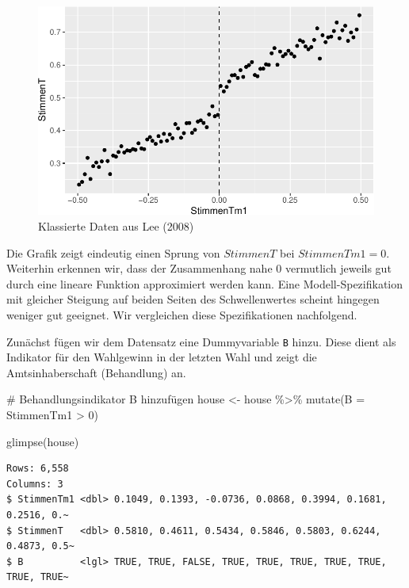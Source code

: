 \documentclass[
  a4paper,
  DIV=11,
  oneside]{scrreprt}
\newenvironment{Shaded}{\begin{snugshade}}{\end{snugshade}}
\newcommand{\AttributeTok}[1]{\textcolor[rgb]{0.40,0.45,0.13}{#1}}
\newcommand{\CommentTok}[1]{\textcolor[rgb]{0.37,0.37,0.37}{#1}}
\newcommand{\DecValTok}[1]{\textcolor[rgb]{0.68,0.00,0.00}{#1}}
\newcommand{\FunctionTok}[1]{\textcolor[rgb]{0.28,0.35,0.67}{#1}}
\newcommand{\NormalTok}[1]{\textcolor[rgb]{0.00,0.23,0.31}{#1}}
\newcommand{\OtherTok}[1]{\textcolor[rgb]{0.00,0.23,0.31}{#1}}
\newcommand{\SpecialCharTok}[1]{\textcolor[rgb]{0.37,0.37,0.37}{#1}}
\begin{document}
\begin{figure}[t]

{\centering \includegraphics{RDD_files/figure-pdf/fig-LeeDataClass-1.pdf}

}

\caption{\label{fig-LeeDataClass}Klassierte Daten aus Lee (2008)}

\end{figure}

Die Grafik zeigt eindeutig einen Sprung von \(StimmenT\) bei
\(StimmenTm1 = 0\). Weiterhin erkennen wir, dass der Zusammenhang nahe
\(0\) vermutlich jeweils gut durch eine lineare Funktion approximiert
werden kann. Eine Modell-Spezifikation mit gleicher Steigung auf beiden
Seiten des Schwellenwertes scheint hingegen weniger gut geeignet. Wir
vergleichen diese Spezifikationen nachfolgend.

Zunächst fügen wir dem Datensatz eine Dummyvariable \texttt{B} hinzu.
Diese dient als Indikator für den Wahlgewinn in der letzten Wahl und
zeigt die Amtsinhaberschaft (Behandlung) an.

\begin{Shaded}
\begin{Highlighting}[]
\CommentTok{\# Behandlungsindikator B hinzufügen}
\NormalTok{house }\OtherTok{\textless{}{-}}\NormalTok{ house }\SpecialCharTok{\%\textgreater{}\%} 
  \FunctionTok{mutate}\NormalTok{(}\AttributeTok{B =}\NormalTok{ StimmenTm1 }\SpecialCharTok{\textgreater{}} \DecValTok{0}\NormalTok{)}

\FunctionTok{glimpse}\NormalTok{(house)}
\end{Highlighting}
\end{Shaded}

\begin{verbatim}
Rows: 6,558
Columns: 3
$ StimmenTm1 <dbl> 0.1049, 0.1393, -0.0736, 0.0868, 0.3994, 0.1681, 0.2516, 0.~
$ StimmenT   <dbl> 0.5810, 0.4611, 0.5434, 0.5846, 0.5803, 0.6244, 0.4873, 0.5~
$ B          <lgl> TRUE, TRUE, FALSE, TRUE, TRUE, TRUE, TRUE, TRUE, TRUE, TRUE~
\end{verbatim}
\end{document}
